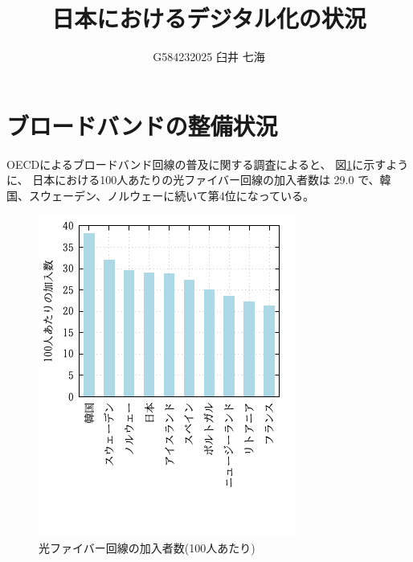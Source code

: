 \documentclass[a4paper,11pt,dvipdfmx]{ujarticle}
\title{日本におけるデジタル化の状況}
\author{G584232025 臼井 七海}
\begin{document}
\maketitle %

\section{ブロードバンドの整備状況}

OECDによるブロードバンド回線の普及に関する調査\cite{oecd}によると、
図\ref{fig:加入者数}に示すように、
日本における100人あたりの光ファイバー回線の加入者数は 29.0 で、韓国、スウェーデン、ノルウェーに続いて第4位になっている。

\begin{figure}[htbp]
    \centering
    \includegraphics{graph.png}
    \caption{光ファイバー回線の加入者数(100人あたり)}\label{fig:加入者数}
\end{figure}
\end{document}
